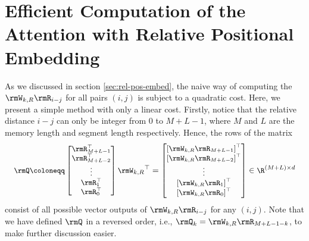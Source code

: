 \section{Efficient Computation of the Attention with Relative Positional Embedding}
\label{sec:A-efficient-attention}
As we discussed in section \ref{sec:rel-pos-embed}, the naive way of computing the $\rmW_{k,R} \rmR_{i-j}$ for all pairs $(i, j)$ is subject to a quadratic cost.
Here, we present a simple method with only a linear cost.
Firstly, notice that the relative distance $i - j$ can only be integer from 0 to $M+L-1$, where $M$ and $L$ are the memory length and segment length respectively.
Hence, the rows of the matrix
\[\small
	\rmQ
	\coloneqq \begin{bmatrix} \rmR_{M+L-1}^\top \\ \rmR_{M+L-2}^\top \\ \vdots \\ \rmR_{1}^\top \\ \rmR_{0}^\top \end{bmatrix} {\rmW_{k,R}}^\top
	= \begin{bmatrix}
		\left[ \rmW_{k,R} \rmR_{M+L-1} \right]^\top \\
		\left[ \rmW_{k,R} \rmR_{M+L-2} \right]^\top \\ \vdots \\
		\left[ \rmW_{k,R} \rmR_{1} \right]^\top \\
		\left[ \rmW_{k,R} \rmR_{0} \right]^\top \end{bmatrix}
	\in \R^{(M+L) \times d}
\]
consist of all possible vector outputs of $\rmW_{k,R} \rmR_{i-j}$ for any $(i, j)$.
Note that we have defined $\rmQ$ in a reversed order, i.e., $\rmQ_k = \rmW_{k,R} \rmR_{M+L-1-k}$, to make further discussion easier.

